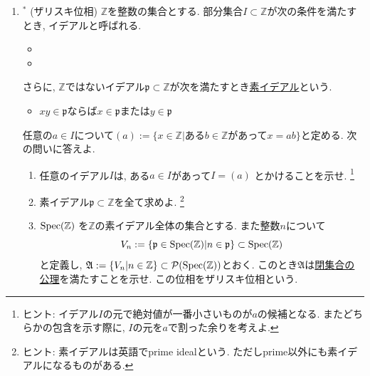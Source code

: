\documentclass[dvipdfmx,a4paper,11pt]{article}
\newcommand{\Z}{\mathbb{Z}}
\theoremstyle{definition}
\begin{document}
\begin{enumerate}[label=\textbf{問}\ref*{sec-open}.\arabic*]
\item $^{*}$ \label{Zariski_topology} (ザリスキ位相)
$\Z$を整数の集合とする.
部分集合$I \subset \Z$が次の条件を満たすとき, イデアルと呼ばれる.
\begin{itemize}
	\setlength{\parskip}{0cm}
	\setlength{\itemsep}{0pt} 
\item {}
\item \text{$x\in I$, $a \in \Z$ならば$a x \in I$}
\end{itemize}
さらに, $\Z$ではないイデアル$\mathfrak{p} \subset \Z$が次を満たすとき\underline{素イデアル}という.
\begin{itemize}
	\setlength{\parskip}{0cm}
	\setlength{\itemsep}{0pt} 
\item $x y \in \mathfrak{p}$ならば$x \in \mathfrak{p}$または$y \in \mathfrak{p}$
\end{itemize}
任意の$a \in I$について$(a) :=  \{ x \in \Z | \text{ある$b \in \Z$があって$x =ab$}\}$と定める.
次の問いに答えよ.
\begin{enumerate}
\setlength{\parskip}{0cm}
\setlength{\itemsep}{0pt} 
\item 任意のイデアル$I$は, ある$a \in I$があって$I = (a)$
とかけることを示せ. 
\footnote{ヒント: イデアル$I$の元で絶対値が一番小さいものが$a$の候補となる. またどちらかの包含を示す際に, $I$の元を$a$で割った余りを考えよ. }
\item 素イデアル$\mathfrak{p}  \subset \Z$を全て求めよ. \footnote{ヒント: 素イデアルは英語でprime idealという. ただしprime以外にも素イデアルになるものがある.}
\item ${\rm Spec}(\Z)$ を$\Z$の素イデアル全体の集合とする. また整数$n$について
$$
V_{n} := \{ \mathfrak{p} \in {\rm Spec}(\Z) | n\in \mathfrak{p}\} \subset {\rm Spec}(\Z) 
$$
と定義し, $\mathfrak{A} := \{V_{n} | n \in \Z \} \subset \mathcal{P}({\rm Spec}(\Z) ) $とおく.
このとき$\mathfrak{A}$は\underline{閉集合の公理}を満たすことを示せ. この位相をザリスキ位相という. 
\end{enumerate}





\end{enumerate}
\end{document}
